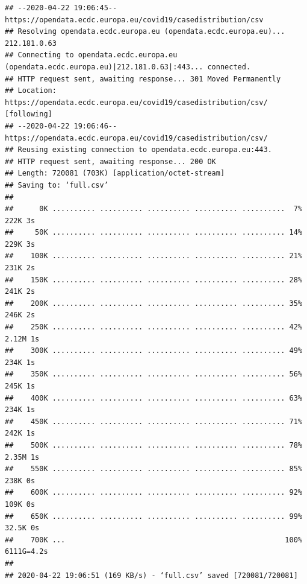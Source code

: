 \documentclass[]{article}
\newenvironment{Shaded}{\begin{snugshade}}{\end{snugshade}}
\newcommand{\CommentTok}[1]{\textcolor[rgb]{0.56,0.35,0.01}{\textit{#1}}}
\newcommand{\KeywordTok}[1]{\textcolor[rgb]{0.13,0.29,0.53}{\textbf{#1}}}
\newcommand{\NormalTok}[1]{#1}
\newcommand{\OperatorTok}[1]{\textcolor[rgb]{0.81,0.36,0.00}{\textbf{#1}}}
\newcommand{\StringTok}[1]{\textcolor[rgb]{0.31,0.60,0.02}{#1}}
\begin{document}
\begin{verbatim}
## --2020-04-22 19:06:45--  https://opendata.ecdc.europa.eu/covid19/casedistribution/csv
## Resolving opendata.ecdc.europa.eu (opendata.ecdc.europa.eu)... 212.181.0.63
## Connecting to opendata.ecdc.europa.eu (opendata.ecdc.europa.eu)|212.181.0.63|:443... connected.
## HTTP request sent, awaiting response... 301 Moved Permanently
## Location: https://opendata.ecdc.europa.eu/covid19/casedistribution/csv/ [following]
## --2020-04-22 19:06:46--  https://opendata.ecdc.europa.eu/covid19/casedistribution/csv/
## Reusing existing connection to opendata.ecdc.europa.eu:443.
## HTTP request sent, awaiting response... 200 OK
## Length: 720081 (703K) [application/octet-stream]
## Saving to: ‘full.csv’
## 
##      0K .......... .......... .......... .......... ..........  7%  222K 3s
##     50K .......... .......... .......... .......... .......... 14%  229K 3s
##    100K .......... .......... .......... .......... .......... 21%  231K 2s
##    150K .......... .......... .......... .......... .......... 28%  241K 2s
##    200K .......... .......... .......... .......... .......... 35%  246K 2s
##    250K .......... .......... .......... .......... .......... 42% 2.12M 1s
##    300K .......... .......... .......... .......... .......... 49%  234K 1s
##    350K .......... .......... .......... .......... .......... 56%  245K 1s
##    400K .......... .......... .......... .......... .......... 63%  234K 1s
##    450K .......... .......... .......... .......... .......... 71%  242K 1s
##    500K .......... .......... .......... .......... .......... 78% 2.35M 1s
##    550K .......... .......... .......... .......... .......... 85%  238K 0s
##    600K .......... .......... .......... .......... .......... 92%  109K 0s
##    650K .......... .......... .......... .......... .......... 99% 32.5K 0s
##    700K ...                                                   100% 6111G=4.2s
## 
## 2020-04-22 19:06:51 (169 KB/s) - ‘full.csv’ saved [720081/720081]
\end{verbatim}

\begin{Shaded}
\end{Shaded}
\end{document}
